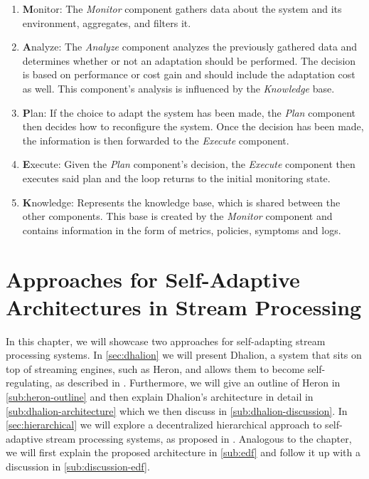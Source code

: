     \begin{enumerate}
    \label{enum:mape}
        \item \textbf{M}onitor: 
            The \textit{Monitor} component gathers data about the system and its environment, aggregates, and filters it.
        \item \textbf{A}nalyze: 
            The \textit{Analyze} component analyzes the previously gathered data and determines whether or not an adaptation should be performed.
            The decision is based on performance or cost gain and should include the adaptation cost as well.
            This component's analysis is influenced by the \textit{Knowledge} base.
        \item \textbf{P}lan: 
            If the choice to adapt the system has been made, the \textit{Plan} component then decides how to reconfigure the system.
            Once the decision has been made, the information is then forwarded to the \textit{Execute} component.
        \item \textbf{E}xecute: 
            Given the \textit{Plan} component's decision, the \textit{Execute} component then executes said plan and the loop 
            returns to the initial monitoring state.
        \item \textbf{K}nowledge: 
            Represents the knowledge base, which is shared between the other components.
            This base is created by the \textit{Monitor} component and contains information in the form of metrics, policies, symptoms and logs.
    \end{enumerate}
   


\chapter{Approaches for Self-Adaptive Architectures in Stream Processing}
\label{cha:approaches}
In this chapter, we will showcase two approaches for self-adapting stream processing systems.
In \ref{sec:dhalion} we will present Dhalion, a system that sits on top of streaming engines, such as Heron, and allows them to become self-regulating, as described in \cite{dhalion}.
Furthermore, we will give an outline of Heron in \ref{sub:heron-outline} and then explain Dhalion's architecture in detail in \ref{sub:dhalion-architecture} which we then discuss in \ref{sub:dhalion-discussion}.
In \ref{sec:hierarchical} we will explore a decentralized hierarchical approach to self-adaptive stream processing systems, as proposed in \cite{cardellini}. Analogous to the  chapter, we will first 
explain the proposed architecture in \ref{sub:edf} and follow it up with a discussion in \ref{sub:discussion-edf}.

